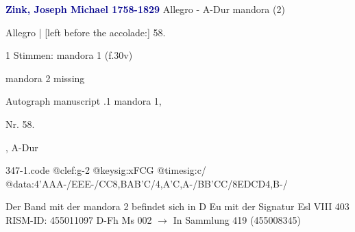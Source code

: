 \documentclass[twocolumn]{book}
\begin{document}
\newline \par \vspace{7pt} \textcolor{darkblue}{\textbf{Zink, Joseph Michael  1758-1829}}
\newline Allegro - A-Dur
\newline mandora (2)
\newline \begin{itshape}[f.30v, at left:] Allegro | [left before the accolade:] 58.\end{itshape} 
\newline \textcolor{darkblue}{}  1 Stimmen: mandora 1  (f.30v)
\newline \begin{small} mandora 2 missing\end{small} 
\newline Autograph manuscript
.1  mandora 1, \begin{itshape}Nr. 58.\end{itshape}, A-Dur  
\begin{filecontents*}{347-1.code}
@clef:g-2
@keysig:xFCG
@timesig:c/
@data:4'AAA-/EEE-/CC8,BAB'C/4,A'C,A-/BB'CC/8EDCD4,B-/
\end{filecontents*}
\newline
%
\newline Der Band mit der mandora 2 befindet sich in D Eu mit der Signatur Esl VIII 403
\newline RISM-ID: 455011097
\newline D-Fh  Ms 002
\newline $\rightarrow$ In Sammlung 419 (455008345)
      
\end{document}
